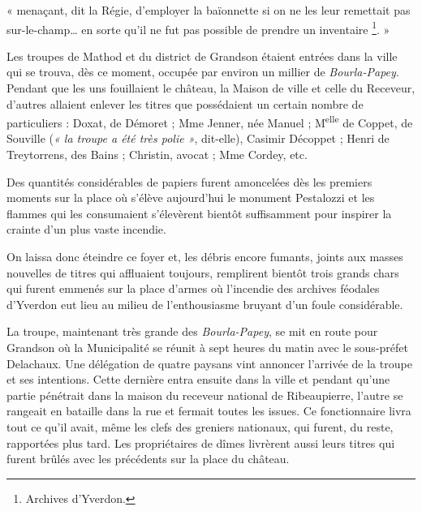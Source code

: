 \documentclass[french,twoside]{book} %
\newenvironment{quoteblock}%
  {\begin{quoting}}
  {\end{quoting}}
\newenvironment{quotebar}{%
    \def\FrameCommand{{\color{rubric!10!}\vrule width 0.5em} \hspace{0.9em}}%
    \def\OuterFrameSep{\itemsep} %
    \MakeFramed {\advance\hsize-\width \FrameRestore}
  }%
  {%
    \endMakeFramed
  }
\renewenvironment{quoteblock}%
  {%
    \savenotes
    \setstretch{0.9}
    \begin{quotebar}
  }
  {%
    \end{quotebar}
    \spewnotes
  }
\begin{document}
\begin{quoteblock}
\noindent « menaçant, dit la Régie, d’employer la baïonnette si on ne les leur remettait pas sur-le-champ… en sorte qu’il ne fut pas possible de prendre un inventaire \footnote{Archives d’Yverdon.}. »\end{quoteblock}

\noindent Les troupes de Mathod et du district de Grandson étaient entrées dans la ville qui se trouva, dès ce moment, occupée par environ un millier de \emph{Bourla-Papey}. Pendant que les uns fouillaient le château, la Maison de ville et celle du Receveur, d’autres allaient enlever les titres que possédaient un certain nombre de particuliers : Doxat, de Démoret ; Mme Jenner, née Manuel ; M\textsuperscript{elle} de Coppet, de Souville (\emph{« la troupe a été très polie »}, dit-elle), Casimir Décoppet ; Henri de Treytorrens, des Bains ; Christin, avocat ; Mme Cordey, etc.\par
Des quantités considérables de papiers furent amoncelées dès les premiers moments sur la place où s’élève aujourd’hui le monument Pestalozzi et les flammes qui les consumaient s’élevèrent bientôt suffisamment pour inspirer la crainte d’un plus vaste incendie.\par
On laissa donc éteindre ce foyer et, les débris encore fumants, joints aux masses nouvelles de titres qui affluaient toujours, remplirent bientôt trois grands chars qui furent emmenés sur la place d’armes où l’incendie des archives féodales d’Yverdon eut lieu au milieu de l’enthousiasme bruyant d’un foule considérable.\par
La troupe, maintenant très grande des \emph{Bourla-Papey}, se mit en route pour Grandson où la Municipalité se réunit à sept heures du matin avec le sous-préfet Delachaux. Une délégation de quatre paysans vint annoncer l’arrivée de la troupe et ses intentions. Cette dernière entra ensuite dans la ville et pendant qu’une partie pénétrait dans la maison du receveur national de Ribeaupierre, l’autre se rangeait en bataille dans la rue et fermait toutes les issues. Ce fonctionnaire livra tout ce qu’il avait, même les clefs des greniers nationaux, qui furent, du reste, rapportées plus tard. Les propriétaires de dîmes livrèrent aussi leurs titres qui furent brûlés avec les précédents sur la place du château.\par
\end{document}
